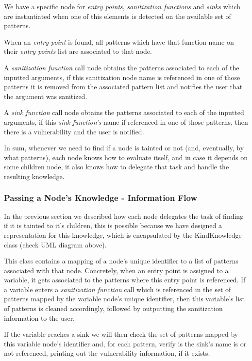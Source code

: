 \documentclass[10pt,onecolumn,a4paper]{article}
\begin{document}
We have a specific node for \emph{entry points}, \emph{sanitization functions} and \emph{sinks} which are instantiated when one of this elements is detected on the available set of patterns.

When an \emph{entry point} is found, all patterns which have that function name on their \emph{entry points} list are associated to that node.

A \emph{sanitization function} call node obtains the patterns associated to each of the inputted arguments,
if this sanitization node name is referenced in one of those patterns it is removed from the associated pattern list and notifies the user that the argument was sanitized.

A \emph{sink function} call node obtains the patterns associated to each of the inputted arguments, if this \emph{sink function's} name if referenced in one of those patterns, then there is a vulnerability and the user is notified.

In sum, whenever we need to find if a node is tainted or not (and, eventually, by what patterns), each node knows how to evaluate itself, and in case it depends on some children node, it also knows how to delegate that task and handle the resulting knowledge.

		
	\subsubsection{Passing a Node's Knowledge - Information Flow}
\hspace{3.5mm} In the previous section we described how each node delegates the task of finding if it is tainted to it's children, this is possible because we have designed a representation for this knowledge, which is encapsulated by the KindKnowledge class (check UML diagram above). 

This class contains a mapping of a node's unique identifier to a list of patterns associated with that node. Concretely, when an entry point is assigned to a variable, it gets associated to the patterns where this entry point is referenced. If a variable enters a \emph{sanitization function} call which is referenced in the set of patterns mapped by the variable node's unique identifier, then this variable's list of patterns is cleaned accordingly, followed by outputting the sanitization information to the user.
		
If the variable reaches a sink we will then check the set of patterns mapped by this variable node's identifier and, for each pattern, verify is the sink's name is or not referenced, printing out the vulnerability information, if it exists.
		
\end{document}
